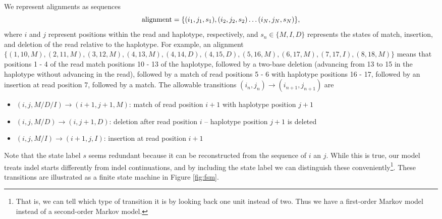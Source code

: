 \documentclass[nofootinbib,amssymb,amsmath]{revtex4}
\begin{document}
We represent alignments as sequences
\begin{equation}
{\rm alignment} = \{ (i_1, j_1, s_1), (i_2, j_2, s_2) \ldots (i_N, j_N, s_N) \},
\end{equation}
where $i$ and $j$ represent positions within the read and haplotype, respectively, and $s_n \in \{ M, I, D \}$ represents the states of match, insertion, and deletion of the read relative to the haplotype.  For example, an alignment $\{ (1,10, M), (2,11, M), (3,12, M), (4,13, M), (4,14, D), (4,15, D), (5,16, M), (6,17, M), (7,17, I), (8,18, M) \}$ means that positions 1 - 4 of the read match positions 10 - 13 of the haplotype, followed by a two-base deletion (advancing from 13 to 15 in the haplotype without advancing in the read), followed by a match of read positions 5 - 6 with haplotype positions 16 - 17, followed by an insertion at read position 7, followed by a match.  The allowable transitions $(i_n, j_n) \rightarrow (i_{n+1}, j_{n+1})$ are
\begin{itemize}
\item $(i, j, M/D/I) \rightarrow (i+1, j+1, M)$: match of read position $i+1$ with haplotype position $j + 1$
\item $(i, j, M/D) \rightarrow (i, j+1, D)$: deletion after read position $i$ -- haplotype position $j+1$ is deleted
\item $(i, j, M/I) \rightarrow (i + 1, j, I)$: insertion at read position $i + 1$
\end{itemize}
Note that the state label $s$ seems redundant because it can be reconstructed from the sequence of $i$ an $j$.  While this is true, our model treats indel starts differently from indel continuations, and by including the state label we can distinguish these conveniently\footnote{That is, we can tell which type of transition it is by looking back one unit instead of two.  Thus we have a first-order Markov model instead of a second-order Markov model.}.  These transitions are illustrated as a finite state machine in Figure \ref{fig:fsm}.
\end{document}
